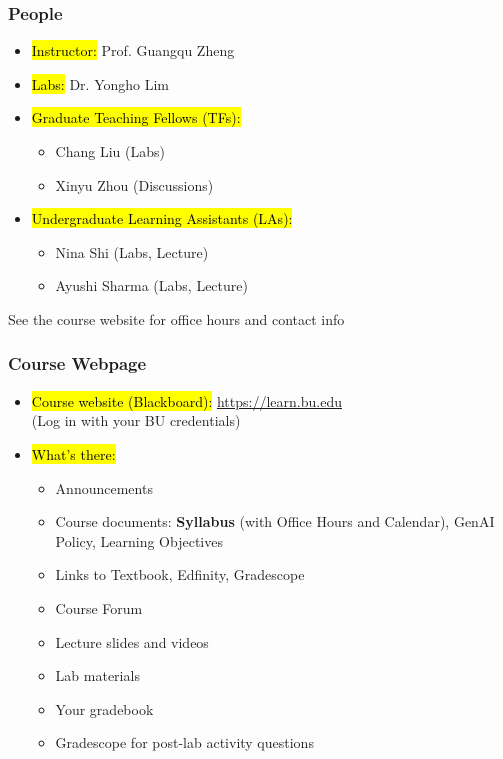 \documentclass[slidestop,compress,mathserif]{beamer}
\begin{document}
\begin{frame}
	\frametitle{People}
	\begin{itemize}
		\item \hl{Instructor:} Prof. Guangqu Zheng 
		\item \hl{Labs:} Dr. Yongho Lim
		\item \hl{Graduate Teaching Fellows (TFs):} 
		\begin{itemize}
			\item Chang Liu (Labs)
			\item Xinyu Zhou (Discussions)
		\end{itemize}
		\item \hl{Undergraduate Learning Assistants (LAs):}
		\begin{itemize}
			\item Nina Shi (Labs, Lecture)
			\item Ayushi Sharma (Labs, Lecture)
		\end{itemize}
	\end{itemize}

	See the course website for office hours and contact info
\end{frame}


\begin{frame}
	\frametitle{Course Webpage} 
	\begin{itemize}
		\item \hl{Course website (Blackboard):} \url{https://learn.bu.edu} \\
		(Log in with your BU credentials)
		\item \hl{What's there:}
		\begin{itemize}
			\item Announcements
			\item Course documents: \textbf{Syllabus} (with Office Hours and Calendar), GenAI Policy, Learning Objectives
			\item Links to Textbook, Edfinity, Gradescope
			\item Course Forum
			\item Lecture slides and videos
			\item Lab materials
			\item Your gradebook
			\item Gradescope for post-lab activity questions
		\end{itemize}
	\end{itemize}	
\end{frame}
\end{document}
